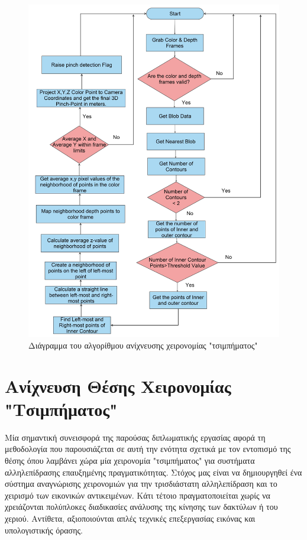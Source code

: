 \begin{figure}[H]
    \centering
    \includegraphics[scale=0.5, angle=0]{Files/Figures/pinch_gesture_detection.png}
    \caption[Διάγραμμα του αλγορίθμου ανίχνευσης χειρονομίας "τσιμπήματος"]{Διάγραμμα του αλγορίθμου ανίχνευσης χειρονομίας "τσιμπήματος"}
    \label{fig:gesture_rec}
\end{figure}






\section{Ανίχνευση Θέσης Χειρονομίας "Τσιμπήματος"}


Μία σημαντική συνεισφορά της παρούσας διπλωματικής εργασίας αφορά τη μεθοδολογία που παρουσιάζεται σε αυτή την ενότητα σχετικά με τον εντοπισμό της θέσης όπου λαμβάνει χώρα μία χειρονομία "τσιμπήματος" για συστήματα αλληλεπίδρασης επαυξημένης πραγματικότητας. Στόχος μας είναι να δημιουργηθεί ένα σύστημα αναγνώρισης χειρονομιών για την τρισδιάστατη αλληλεπίδραση και το χειρισμό των εικονικών αντικειμένων. Κάτι τέτοιο πραγματοποιείται χωρίς να χρειάζονται πολύπλοκες διαδικασίες ανάλυσης της κίνησης των δακτύλων ή του χεριού. Αντίθετα, αξιοποιούνται απλές τεχνικές επεξεργασίας εικόνας και υπολογιστικής όρασης.


